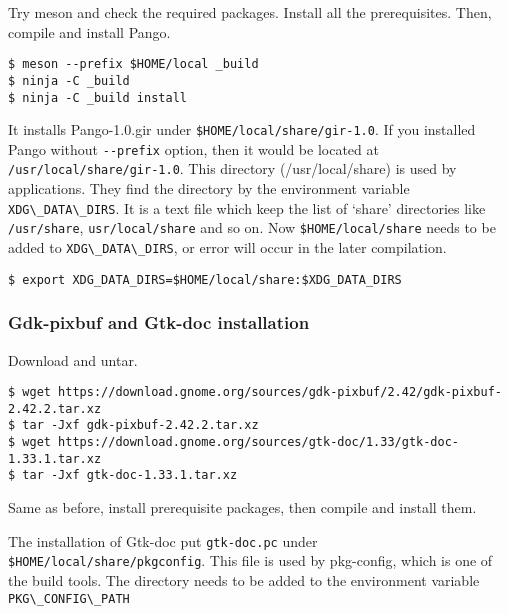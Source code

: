 Try meson and check the required packages. Install all the
prerequisites. Then, compile and install Pango.

\begin{lstlisting}
$ meson --prefix $HOME/local _build
$ ninja -C _build
$ ninja -C _build install
\end{lstlisting}

It installs Pango-1.0.gir under
\passthrough{\lstinline!$HOME/local/share/gir-1.0!}. If you installed
Pango without \passthrough{\lstinline!--prefix!} option, then it would
be located at \passthrough{\lstinline!/usr/local/share/gir-1.0!}. This
directory (/usr/local/share) is used by applications. They find the
directory by the environment variable
\passthrough{\lstinline!XDG\_DATA\_DIRS!}. It is a text file which keep
the list of `share' directories like
\passthrough{\lstinline!/usr/share!},
\passthrough{\lstinline!usr/local/share!} and so on. Now
\passthrough{\lstinline!$HOME/local/share!} needs to be added to
\passthrough{\lstinline!XDG\_DATA\_DIRS!}, or error will occur in the
later compilation.

\begin{lstlisting}
$ export XDG_DATA_DIRS=$HOME/local/share:$XDG_DATA_DIRS
\end{lstlisting}

\hypertarget{gdk-pixbuf-and-gtk-doc-installation}{%
\subsubsection{Gdk-pixbuf and Gtk-doc
installation}\label{gdk-pixbuf-and-gtk-doc-installation}}

Download and untar.

\begin{lstlisting}
$ wget https://download.gnome.org/sources/gdk-pixbuf/2.42/gdk-pixbuf-2.42.2.tar.xz
$ tar -Jxf gdk-pixbuf-2.42.2.tar.xz
$ wget https://download.gnome.org/sources/gtk-doc/1.33/gtk-doc-1.33.1.tar.xz
$ tar -Jxf gtk-doc-1.33.1.tar.xz
\end{lstlisting}

Same as before, install prerequisite packages, then compile and install
them.

The installation of Gtk-doc put \passthrough{\lstinline!gtk-doc.pc!}
under \passthrough{\lstinline!$HOME/local/share/pkgconfig!}. This file
is used by pkg-config, which is one of the build tools. The directory
needs to be added to the environment variable
\passthrough{\lstinline!PKG\_CONFIG\_PATH!}

